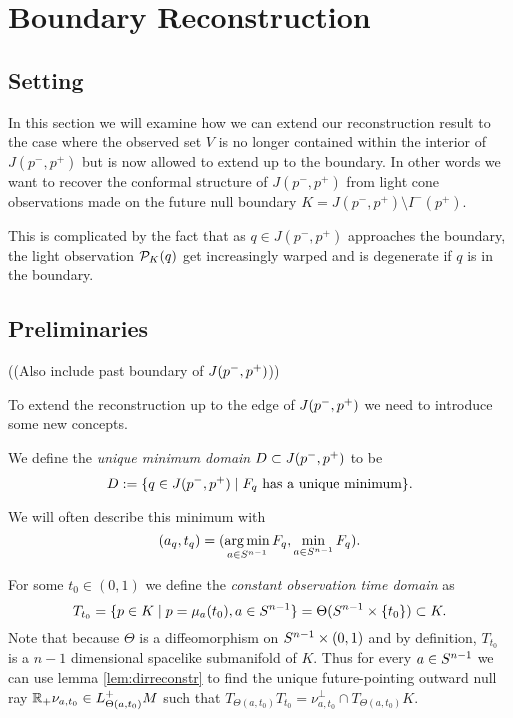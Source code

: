 \chapter{Boundary Reconstruction}

\section{Setting}

In this section we will examine how we can extend our reconstruction result to the case where the observed set $V$ is no longer contained within the interior of $J(p^-,p^+)$ but is now allowed to extend up to the boundary. In other words we want to recover the conformal structure of $J(p^-,p^+)$ from light cone observations made on the future null boundary $K = J(p^-,p^+) \setminus I^-(p^+)$.

This is complicated by the fact that as $q\in J(p^-,p^+)$ approaches the boundary, the light observation ${\mathcal{P}}_K(q)$ get increasingly warped and is degenerate if $q$ is in the boundary. 

\section{Preliminaries}
((Also include past boundary of $J(p^-,p^+)$))

To extend the reconstruction up to the edge of $J(p^-,p^+)$ we need to introduce some new concepts.

\begin{definition}\label{def:uniquemindomain}
    We define the \emph{unique minimum domain} $D\subset J(p^-,p^+)$ to be 
    \begin{equation}
        D:=\{q\in J(p^-,p^+) \mid F_q\text{ has a unique minimum}\}.
    \end{equation}

    We will often describe this minimum with 
    \[
        (a_q,t_q)=(\operatorname*{arg\,min}_{a\in {S^{n-1}}} F_q, \min_{a\in {S^{n-1}}} F_q).
    \]
\end{definition}

\begin{definition}\label{def:constobstime} For some $t_0\in (0,1)$ we define the \emph{constant observation time domain} as 
\begin{equation}
    T_{t_0} = \{p\in K \mid p=\mu_a(t_0), a\in {S^{n-1}}\} = \Theta({S^{n-1}}\times \{t_0\}) \subset K.
\end{equation}
Note that because $\Theta$ is a diffeomorphism on ${S^{n-1}} \times (0,1)$ and by definition, $T_{t_0}$ is a $n-1$ dimensional spacelike submanifold of $K$. 
Thus for every $a\in {S^{n-1}}$ we can use lemma \ref{lem:dirreconstr} to find the unique future-pointing outward null ray $\mathbb{R}_+\nu_{a,t_0}\in L^+_{\Theta(a,t_0)}M$ such that $T_{\Theta(a,t_0)}T_{t_0} = \nu_{a,t_0}^\perp \cap T_{\Theta(a,t_0)}K$.
\end{definition}

